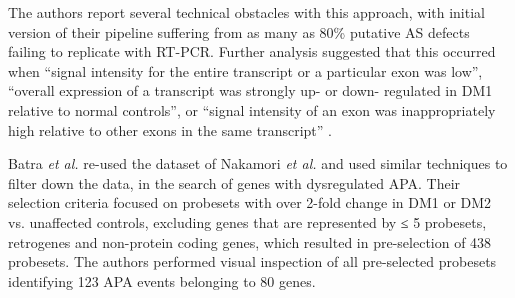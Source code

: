 \documentclass[10pt,letterpaper]{article}
\begin{document}
The authors report several technical obstacles with this approach, with initial version of their pipeline suffering from as many as 80\% putative AS defects failing to replicate with RT-PCR. Further analysis suggested that this occurred when \enquote{signal intensity for the entire transcript or a particular exon was low}, \enquote{overall expression of a transcript was strongly up- or down- regulated in DM1 relative to normal controls}, or \enquote{signal intensity of an exon was inappropriately high relative to other exons in the same transcript} \cite{Nakamori2013}.

Batra {\it et al.} \cite{Batra2014} re-used the dataset of Nakamori {\it et al.} \cite{Nakamori2013} and used similar techniques to filter down the data, in the search of genes with dysregulated APA. Their selection criteria focused on probesets with over 2-fold change in DM1 or DM2 vs. unaffected controls, excluding genes that are represented by ≤ 5 probesets, retrogenes and non-protein coding genes, which resulted in pre-selection of 438 probesets. The authors performed visual inspection of all pre-selected probesets identifying 123 APA events belonging to 80 genes.





\end{document}
